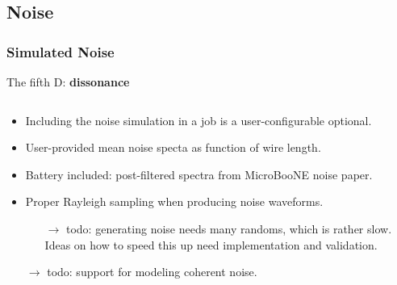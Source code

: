 \documentclass[xcolor=dvipsnames]{beamer}
\begin{document}
\subsection{Noise}
\begin{frame}
\end{frame}

\begin{frame}
  \frametitle{Simulated Noise}
  The fifth D: \textbf{dissonance}

  \begin{columns}
    \begin{column}{0.7\textwidth}
      \begin{itemize}\footnotesize
      \item Including the noise simulation in a job is a user-configurable optional.
      \item User-provided mean noise specta as function of wire length.
      \item Battery included: post-filtered spectra from MicroBooNE noise paper.
      \item Proper Rayleigh sampling when producing noise waveforms.
        \begin{itemize}\tiny
        \item[$\to$] todo: generating noise needs many randoms, which is
          rather slow. 
          Ideas on how to speed this up need implementation and validation.
        \end{itemize}
      \item[$\to$] todo: support for modeling coherent noise.
      \end{itemize}
    \end{column}
    \begin{column}{0.3\textwidth}


\end{column}
\end{columns}
\end{frame}
\end{document}
